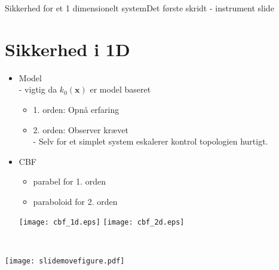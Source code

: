 \begin{frame}{Sikkerhed for et 1 dimensionelt system}{Det første skridt - instrument slide}
\section{Sikkerhed i 1D}
\vspace*{-0.5cm}
\begin{minipage}{0.6\textwidth}
\begin{block}{}
	\begin{itemize}
		\item Model \\
		\scriptsize - vigtig da $k_0(\textbf{x})$ er model baseret
		\begin{itemize}
			\item 1. orden: Opnå erfaring
			\item 2. orden: Observer krævet \\ 
			\scriptsize - Selv for et simplet system eskalerer kontrol topologien hurtigt.
		\end{itemize}	
		\item \normalsize CBF
		\begin{itemize}
			\item parabel for 1. orden
			\item paraboloid for 2. orden
		\end{itemize}
			\texttt{[image: cbf\_1d.eps]} \hspace{0.2cm}
			\texttt{[image: cbf\_2d.eps]}
	\end{itemize}
	{\color{white}{lol}}\\
	{\color{white}{lol}}
\end{block}
\vspace{-0.7cm}
\scriptsize
\end{minipage}
\hspace{0.3cm}
\vspace*{-1cm}
\begin{minipage}{0.35\textwidth}
\hspace*{-0.5cm}
\texttt{[image: slidemovefigure.pdf]}


\end{minipage}
\end{frame}
